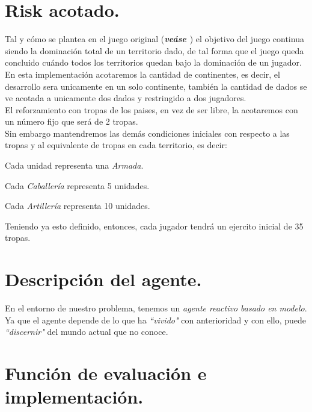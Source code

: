 \documentclass[12pt,twocolumn,draft]{article}
\begin{document}
\section{Risk acotado.}

Tal y c\'omo se plantea en el juego original (\textbf{\textit{ve\'ase \cite{RISK}}}) el objetivo del juego continua siendo la dominaci\'on total de un territorio dado, de tal forma
que el juego queda concluido cu\'ando todos los territorios quedan bajo la dominaci\'on de 
un jugador.\\
En esta implementaci\'on acotaremos la cantidad de continentes, es decir, el desarrollo sera unicamente en un solo continente, tambi\'en la cantidad de dados se ve acotada a unicamente dos dados y restringido a dos jugadores.\\
El reforzamiento con tropas de los paises, en vez de ser libre, la acotaremos con un n\'umero fijo que ser\'a de 2 tropas.\\

Sin embargo mantendremos las dem\'as condiciones iniciales con respecto a las tropas y al equivalente de tropas en cada territorio, es decir:
\begin{list}{*}{}
\item Cada unidad representa una \textit{Armada}.
\item Cada \textit{Caballer\'ia} representa 5 unidades.
\item Cada \textit{Artiller\'ia} representa 10 unidades.
\end{list}

Teniendo ya esto definido, entonces, cada jugador tendr\'a un ejercito inicial de 35 tropas.


\section{Descripci\'on del agente.}
En el entorno de nuestro problema, tenemos un \textit{agente reactivo basado en modelo}.
Ya que el agente depende de lo que ha \textit{``vivido"} con anterioridad y con ello, puede
\textit{``discernir"} del mundo actual que no conoce.

\section{Funci\'on de evaluaci\'on e implementaci\'on.}
\end{document}
